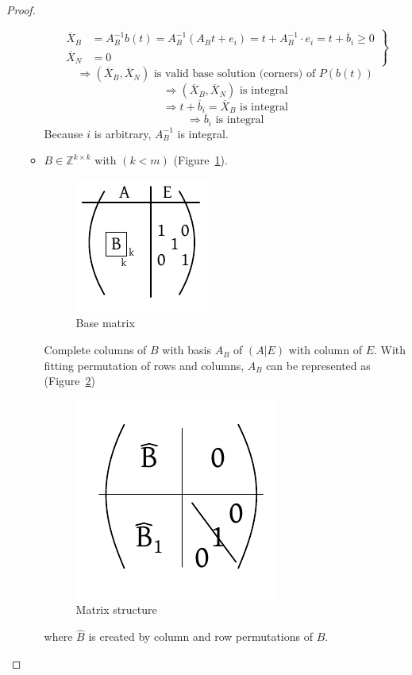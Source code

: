 \documentclass{article}
\begin{document}
\begin{proof}
\begin{itemize}
\begin{itemize}
          \[
            \left.\begin{array}{ll}
              \overline{X}_B &= A_B^{-1} b(t) = A_B^{-1} (A_B t + e_i) = t + A_B^{-1} \cdot e_i = t + \overline{b}_i \geq 0 \\
              \overline{X}_N &= 0
            \end{array}\right\}
          \] %
          \[ \Rightarrow (\overline{X}_B, \overline{X}_N) \text{ is valid base solution (corners) of } P(b(t)) \]
          \[ \Rightarrow (\overline{X}_B, \overline{X}_N) \text{ is integral} \]
          \[ \Rightarrow t + \overline{b}_i = \overline{X}_B \text{ is integral} \]
          \[ \Rightarrow \overline{b}_i \text{ is integral} \]
          Because $i$ is arbitrary, $A_B^{-1}$ is integral.
        \item
          $B \in \mathbb{Z}^{k \times k}$ with $(k < m)$ (Figure~\ref{fig:basematr}).
          \begin{figure}[!ht]
            \begin{center}
              \includegraphics{img/basematrix.pdf}
              \caption{Base matrix}
              \label{fig:basematr}
            \end{center}
          \end{figure}
          Complete columns of $B$ with basis $A_B$ of $(A | E)$ with column of $E$.
          With fitting permutation of rows and columns, $A_B$ can be represented as (Figure~\ref{fig:matstr})
          \begin{figure}[!ht]
            \begin{center}
              \includegraphics{img/matrix_structure.pdf}
              \caption{Matrix structure}
              \label{fig:matstr}
            \end{center}
          \end{figure}
          where $\hat B$ is created by column and row permutations of $B$.
      \end{itemize}


\end{itemize}
\end{proof}
\end{document}
